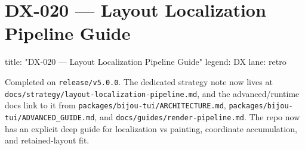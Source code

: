 \chapter{DX-020 --- Layout Localization Pipeline Guide}\label{record-332}

\smallskip

\begin{RecordMeta}
title: "DX-020 — Layout Localization Pipeline Guide"
legend: DX
lane: retro

\end{RecordMeta}

Completed on \texttt{r\allowbreak{}e\allowbreak{}l\allowbreak{}e\allowbreak{}a\allowbreak{}s\allowbreak{}e\allowbreak{}/\allowbreak{}v\allowbreak{}5\allowbreak{}.\allowbreak{}0\allowbreak{}.\allowbreak{}0}. The dedicated strategy note now lives at \texttt{d\allowbreak{}o\allowbreak{}c\allowbreak{}s\allowbreak{}/\allowbreak{}s\allowbreak{}t\allowbreak{}r\allowbreak{}a\allowbreak{}t\allowbreak{}e\allowbreak{}g\allowbreak{}y\allowbreak{}/\allowbreak{}l\allowbreak{}a\allowbreak{}y\allowbreak{}o\allowbreak{}u\allowbreak{}t\allowbreak{}-\allowbreak{}l\allowbreak{}o\allowbreak{}c\allowbreak{}a\allowbreak{}l\allowbreak{}i\allowbreak{}z\allowbreak{}a\allowbreak{}t\allowbreak{}i\allowbreak{}o\allowbreak{}n\allowbreak{}-\allowbreak{}p\allowbreak{}i\allowbreak{}p\allowbreak{}e\allowbreak{}l\allowbreak{}i\allowbreak{}n\allowbreak{}e\allowbreak{}.\allowbreak{}m\allowbreak{}d}, and the advanced/runtime docs link to it from \texttt{p\allowbreak{}a\allowbreak{}c\allowbreak{}k\allowbreak{}a\allowbreak{}g\allowbreak{}e\allowbreak{}s\allowbreak{}/\allowbreak{}b\allowbreak{}i\allowbreak{}j\allowbreak{}o\allowbreak{}u\allowbreak{}-\allowbreak{}t\allowbreak{}u\allowbreak{}i\allowbreak{}/\allowbreak{}A\allowbreak{}R\allowbreak{}C\allowbreak{}H\allowbreak{}I\allowbreak{}T\allowbreak{}E\allowbreak{}C\allowbreak{}T\allowbreak{}U\allowbreak{}R\allowbreak{}E\allowbreak{}.\allowbreak{}m\allowbreak{}d}, \texttt{p\allowbreak{}a\allowbreak{}c\allowbreak{}k\allowbreak{}a\allowbreak{}g\allowbreak{}e\allowbreak{}s\allowbreak{}/\allowbreak{}b\allowbreak{}i\allowbreak{}j\allowbreak{}o\allowbreak{}u\allowbreak{}-\allowbreak{}t\allowbreak{}u\allowbreak{}i\allowbreak{}/\allowbreak{}A\allowbreak{}D\allowbreak{}V\allowbreak{}A\allowbreak{}N\allowbreak{}C\allowbreak{}E\allowbreak{}D\allowbreak{}\_\allowbreak{}G\allowbreak{}U\allowbreak{}I\allowbreak{}D\allowbreak{}E\allowbreak{}.\allowbreak{}m\allowbreak{}d}, and \texttt{d\allowbreak{}o\allowbreak{}c\allowbreak{}s\allowbreak{}/\allowbreak{}g\allowbreak{}u\allowbreak{}i\allowbreak{}d\allowbreak{}e\allowbreak{}s\allowbreak{}/\allowbreak{}r\allowbreak{}e\allowbreak{}n\allowbreak{}d\allowbreak{}e\allowbreak{}r\allowbreak{}-\allowbreak{}p\allowbreak{}i\allowbreak{}p\allowbreak{}e\allowbreak{}l\allowbreak{}i\allowbreak{}n\allowbreak{}e\allowbreak{}.\allowbreak{}m\allowbreak{}d}. The repo now has an explicit deep guide for localization vs painting, coordinate accumulation, and retained-layout fit.

